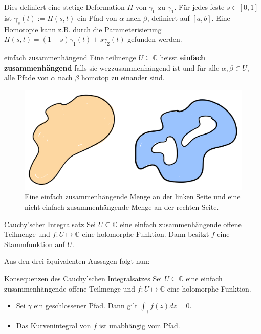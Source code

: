 \documentclass[a4paper,10pt]{article}
\def\C{\mathbb{C}}
\begin{document}
Dies definiert eine stetige Deformation $H$ von $\gamma_0$ zu $\gamma_1$. Für jedes feste $s \in [0,1]$ ist $\gamma_s(t) := H(s, t)$ ein Pfad von $\alpha$ nach $\beta$, definiert auf $[a,b]$. Eine Homotopie kann z.B. durch die Parameterisierung $H(s, t) = (1 - s)\gamma_1(t) + s \gamma_2(t)$ gefunden werden.

\begin{subbox}{einfach zusammenhängend}
  Eine teilmenge $U \subseteq \C$ heisst \textbf{einfach zusammenhängend} falls sie wegzusammenhängend ist und für alle $\alpha, \beta \in U$, alle Pfade von $\alpha$ nach $\beta$ homotop zu einander sind.
\end{subbox}

\begin{figure}[H]
  \centering 
  \includegraphics[width=0.9\linewidth]{assets/connected.png}
  \caption{Eine einfach zusammenhängende Menge an der linken Seite und eine nicht einfach zusammenhängende Menge an der rechten Seite.}
\end{figure}

\begin{mainbox}{Cauchy'scher Integralsatz}
  Sei $U \subseteq \C$ eine einfach zusammenhängende offene Teilmenge und $f: U \mapsto \C$ eine holomorphe Funktion. Dann besitzt $f$ eine Stammfunktion auf $U$.
\end{mainbox}

Aus den drei äquivalenten Aussagen folgt nun:

\begin{subbox}{Konsequenzen des Cauchy'schen Integralsatzes}
  Sei $U \subseteq \C$ eine einfach zusammenhängende offene Teilmenge und $f: U \mapsto \C$ eine holomorphe Funktion.
  \begin{itemize}
    \item Sei $\gamma$ ein geschlossener Pfad. Dann gilt $\int_\gamma f(z) dz = 0$.
    \item Das Kurvenintegral von $f$ ist unabhängig vom Pfad.
  \end{itemize}
\end{subbox}
\end{document}

